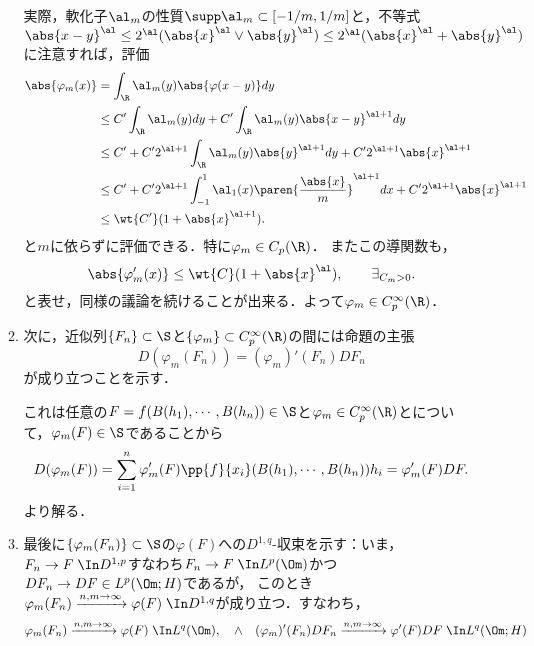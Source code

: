 \documentclass[uplatex,dvipdfmx]{jsreport}
\begin{document}
\begin{Proof}
\begin{enumerate}
\begin{enumerate}[{Step}1]
\begin{Proof}[【証】]
                実際，軟化子$\al_m$の性質$\supp\al_m\subset[-1/m,1/m]$と，不等式
                $\abs{x-y}^\al\le2^\al(\abs{x}^\al\lor\abs{y}^\al)\le2^\al(\abs{x}^\al+\abs{y}^\al)$に注意すれば，評価
                \begin{align*}
                    \abs{\varphi_m(x)}&=\int_\R\al_m(y)\abs{\varphi(x-y)}dy\\
                    &\le C'\int_\R\al_m(y)dy+C'\int_\R\al_m(y)\abs{x-y}^{\al+1}dy\\
                    &\le C'+C'2^{\al+1}\int_\R\al_m(y)\abs{y}^{\al+1}dy+C'2^{\al+1}\abs{x}^{\al+1}\\
                    &\le C'+C'2^{\al+1}\int^1_{-1}\al_1(x)\paren{\frac{\abs{x}}{m}}^{\al+1}dx+C'2^{\al+1}\abs{x}^{\al+1}\\
                    &\le \wt{C'}(1+\abs{x}^{\al+1}).
                \end{align*}
                と$m$に依らずに評価できる．特に$\varphi_m \in C_p(\R)$．
                またこの導関数も，
                \[\abs{\varphi_m'(x)}\le \wt{C}(1+\abs{x}^\al),\qquad\exists_{C_m>0}.\]
                と表せ，同様の議論を続けることが出来る．よって$\varphi_m\in C_p^\infty(\R)$．
            \end{Proof}
            \item 次に，近似列$\{F_n\}\subset\S$と$\{\varphi_m\}\subset C_p^\infty(\R)$の間には命題の主張
                \[D(\varphi_m(F_n))=(\varphi_m)'(F_n)DF_n\]
            が成り立つことを示す．
            \begin{Proof}[【証】]\renewcommand{\qedsymbol}{$\Box$}
                これは任意の$F=f(B(h_1),\cdots,B(h_n))\in\S$と$\varphi_m\in C^\infty_p(\R)$とについて，$\varphi_m(F)\in\S$であることから
                \[D(\varphi_m(F))=\sum_{i=1}^n\varphi_m'(F)\pp{f}{x_i}(B(h_1),\cdots,B(h_n))h_i=\varphi_m'(F)DF.\]
                より解る．
            \end{Proof}
            \item 最後に$\{\varphi_m(F_n)\}\subset\S$の$\varphi(F)$への$D^{1,q}$-収束を示す：いま，$F_n\to F\;\In D^{1,p}$すなわち$F_n\to F\;\In L^p(\Om)$かつ$DF_n\to DF\in L^p(\Om;H)$であるが，
            このとき$\varphi_m(F_n)\xrightarrow{n,m\to\infty}\varphi(F)\;\In D^{1,q}$が成り立つ．すなわち，
            \[\varphi_m(F_n)\xrightarrow{n,m\to\infty}\varphi(F)\;\In L^q(\Om),\quad\land\quad(\varphi_m)'(F_n)DF_n\xrightarrow{n,m\to\infty}\varphi'(F)DF\;\In L^q(\Om;H)\]

\end{enumerate}
\end{enumerate}
\end{Proof}
\end{document}
